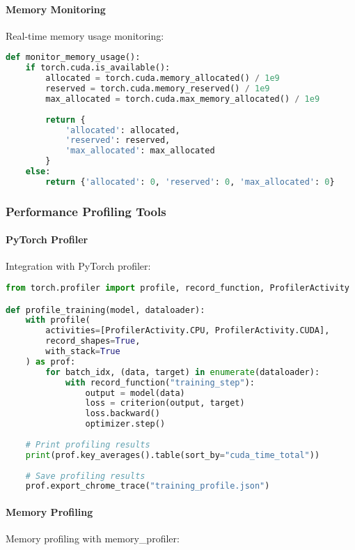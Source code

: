 \paragraph{Memory Monitoring}
Real-time memory usage monitoring:

\begin{lstlisting}[language=python, caption=Memory Monitoring]
def monitor_memory_usage():
    if torch.cuda.is_available():
        allocated = torch.cuda.memory_allocated() / 1e9
        reserved = torch.cuda.memory_reserved() / 1e9
        max_allocated = torch.cuda.max_memory_allocated() / 1e9
        
        return {
            'allocated': allocated,
            'reserved': reserved,
            'max_allocated': max_allocated
        }
    else:
        return {'allocated': 0, 'reserved': 0, 'max_allocated': 0}
\end{lstlisting}

\subsubsection{Performance Profiling Tools}

\paragraph{PyTorch Profiler}
Integration with PyTorch profiler:

\begin{lstlisting}[language=python, caption=PyTorch Profiler]
from torch.profiler import profile, record_function, ProfilerActivity

def profile_training(model, dataloader):
    with profile(
        activities=[ProfilerActivity.CPU, ProfilerActivity.CUDA],
        record_shapes=True,
        with_stack=True
    ) as prof:
        for batch_idx, (data, target) in enumerate(dataloader):
            with record_function("training_step"):
                output = model(data)
                loss = criterion(output, target)
                loss.backward()
                optimizer.step()
    
    # Print profiling results
    print(prof.key_averages().table(sort_by="cuda_time_total"))
    
    # Save profiling results
    prof.export_chrome_trace("training_profile.json")
\end{lstlisting}

\paragraph{Memory Profiling}
Memory profiling with memory\_profiler:

